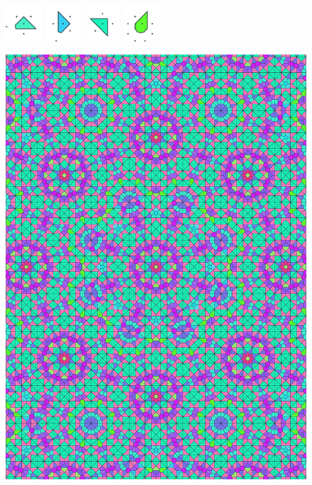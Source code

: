 \documentclass[text.tex]{subfiles}
\begin{document}
\begin{figure}[h!]
\includegraphics[width=0.12\textwidth]{img/results/octagon/octagon_103553_(-10_5alpha_2)_014.pdf}
\includegraphics[width=0.12\textwidth]{img/results/octagon/octagon_103553_(-10_5alpha_2)_015.pdf}
\includegraphics[width=0.12\textwidth]{img/results/octagon/octagon_103553_(-10_5alpha_2)_016.pdf}
\includegraphics[width=0.12\textwidth]{img/results/octagon/octagon_103553_(-10_5alpha_2)_017.pdf}
\end{figure}

\begin{figure}[h!]
\centering
\includegraphics[width=1\textwidth]{img/results/octagon/quasi_polygon-octagon_103553_(-10_5alpha_2).pdf}
\end{figure}
\end{document}
